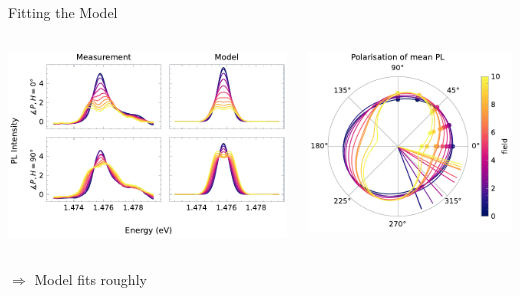 \documentclass[
	10pt,
]{beamer}
\begin{document}
\begin{frame}{Fitting the Model}
	\begin{columns}
		\includegraphics[width=\textwidth]{../figures/2024-04-07 NiPS3 Model.pdf}

		\centering
		\includegraphics[width=\textwidth]{../figures/2024-04-07 NiPS3 polarisation.pdf}
	\end{columns}
	$\Rightarrow$ Model fits roughly
\end{frame}
\end{document}
